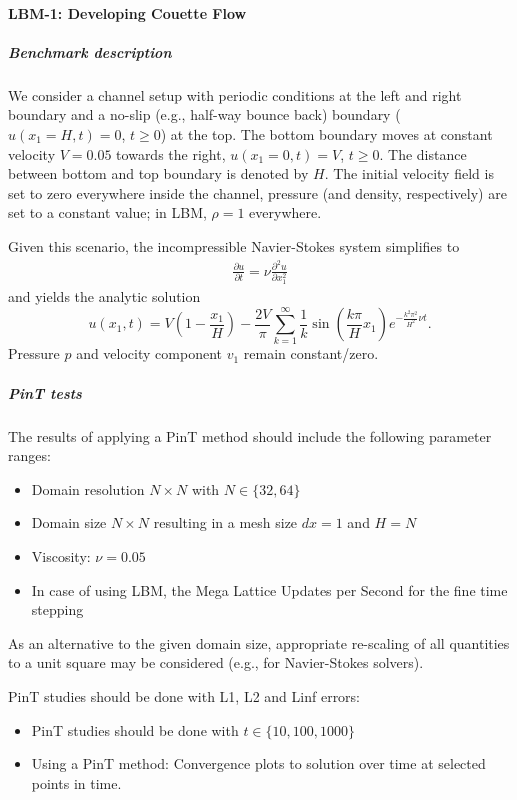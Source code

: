 \paragraph{LBM-1: Developing Couette Flow}

\subparagraph{Benchmark description}

We consider a channel setup with periodic conditions at the left and right boundary and a no-slip (e.g., half-way bounce back) boundary ($u(x_1=H,t)=0$, $t\geq 0$) at the top.
The bottom boundary moves at constant velocity $V=0.05$ towards the right, $u(x_1=0,t) = V$, $t\geq 0$.
The distance between bottom and top boundary is denoted by $H$.
The initial velocity field is set to zero everywhere inside the channel, pressure (and density, respectively) are set to a constant value; in LBM, $\rho=1$ everywhere.

Given this scenario, the incompressible Navier-Stokes system simplifies to~\cite{transientPlaneCouetteFlow}
\begin{eqnarray}
	\frac{\partial u}{\partial t} = \nu \frac{\partial^2 u}{\partial x_1^2}
\end{eqnarray}
and yields the analytic solution
$$
	u(x_1,t) = V\left(1 - \frac{x_1}{H} \right) - \frac{2V}{\pi}\sum_{k=1}^{\infty}\frac{1}{k}\sin\left(\frac{k\pi}{H} x_1\right)e^{-\frac{k^2\pi^2}{H^2}\nu t}.
$$
Pressure $p$ and velocity component $v_1$ remain constant/zero.




\subparagraph{PinT tests}

The results of applying a PinT method should include the following parameter ranges:

\begin{itemize}
	\item Domain resolution $N\times N$ with $N \in \{ 32, 64\}$
	\item Domain size $N \times N$ resulting in a mesh size $dx=1$ and $H=N$
	\item Viscosity: $\nu = 0.05$
	\item In case of using LBM, the Mega Lattice Updates per Second for the fine time stepping
\end{itemize}
As an alternative to the given domain size, appropriate re-scaling of all quantities to a unit square may be considered (e.g., for Navier-Stokes solvers).

PinT studies should be done with L1, L2 and Linf errors:
\begin{itemize}
	\item PinT studies should be done with $t \in \{ 10, 100, 1000 \}$
	\item Using a PinT method: Convergence plots to solution over time at selected points in time.
\end{itemize}

